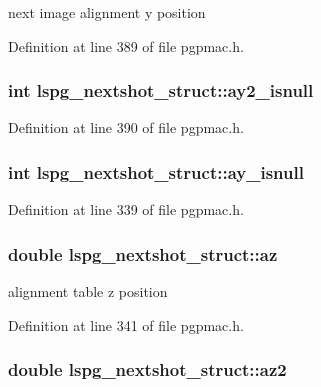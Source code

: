 next image alignment y position 



Definition at line 389 of file pgpmac.\-h.

\hypertarget{structlspg__nextshot__struct_ad0f50ec6339296d3d39c8d95131ab6b5}{
\subsubsection[{ay2\-\_\-isnull}]{\setlength{\rightskip}{0pt plus 5cm}int lspg\-\_\-nextshot\-\_\-struct\-::ay2\-\_\-isnull}}\label{structlspg__nextshot__struct_ad0f50ec6339296d3d39c8d95131ab6b5}


Definition at line 390 of file pgpmac.\-h.

\hypertarget{structlspg__nextshot__struct_a9da91abc8090532ed98ccd47a3bab775}{
\subsubsection[{ay\-\_\-isnull}]{\setlength{\rightskip}{0pt plus 5cm}int lspg\-\_\-nextshot\-\_\-struct\-::ay\-\_\-isnull}}\label{structlspg__nextshot__struct_a9da91abc8090532ed98ccd47a3bab775}


Definition at line 339 of file pgpmac.\-h.

\hypertarget{structlspg__nextshot__struct_a66e678866ce79f6398b66d033ae45a17}{
\subsubsection[{az}]{\setlength{\rightskip}{0pt plus 5cm}double lspg\-\_\-nextshot\-\_\-struct\-::az}}\label{structlspg__nextshot__struct_a66e678866ce79f6398b66d033ae45a17}


alignment table z position 



Definition at line 341 of file pgpmac.\-h.

\hypertarget{structlspg__nextshot__struct_a94698a030fd5b2abf1f10a2ad33476a4}{
\subsubsection[{az2}]{\setlength{\rightskip}{0pt plus 5cm}double lspg\-\_\-nextshot\-\_\-struct\-::az2}}\label{structlspg__nextshot__struct_a94698a030fd5b2abf1f10a2ad33476a4}


